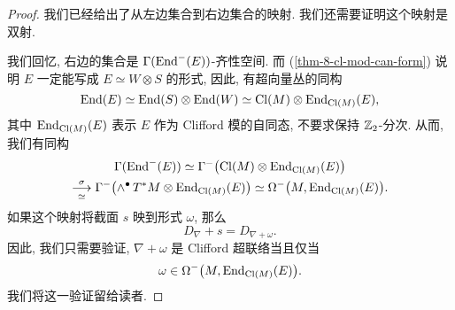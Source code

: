 \begin{proof}
    我们已经给出了从左边集合到右边集合的映射.
    我们还需要证明这个映射是双射.
    
    我们回忆, 右边的集合是 $\Gamma (\operatorname{End}^- (E))$-齐性空间.
    而 (\ref{thm-8-cl-mod-can-form}) 说明
    $E$ 一定能写成 $E \simeq W \otimes S$ 的形式,
    因此, 有超向量丛的同构
    \[ \operatorname{End} (E) \simeq \operatorname{End} (S) \otimes \operatorname{End} (W)
        \simeq \operatorname{Cl} (M) \otimes \operatorname{End}_{\operatorname{Cl} (M)} (E), \]
    其中 $\operatorname{End}_{\operatorname{Cl} (M)} (E)$ 表示 $E$ 作为 Clifford 模的自同态,
    不要求保持 $\mathbb{Z}_2$-分次. 从而, 我们有同构
    \begin{multline*}
        \Gamma (\operatorname{End}^- (E))
        \simeq \Gamma^- \bigl( \operatorname{Cl} (M) \otimes \operatorname{End}_{\operatorname{Cl} (M)} (E) \bigr) \\
        \overset{\sigma}{ \underset{\simeq}{\longrightarrow} }
            \Gamma^- \bigl( \wedge^\bullet \, T^* M \otimes \operatorname{End}_{\operatorname{Cl} (M)} (E) \bigr)
        \simeq \Omega^- \bigl( M, \operatorname{End}_{\operatorname{Cl} (M)} (E) \bigr).
    \end{multline*}
    如果这个映射将截面 $s$ 映到形式 $\omega$, 那么
    \[ D_{\nabla} + s = D_{\nabla + \omega}. \]
    因此, 我们只需要验证, $\nabla + \omega$ 是 Clifford 超联络当且仅当
    \[ \omega \in \Omega^- \bigl( M, \operatorname{End}_{\operatorname{Cl} (M)} (E) \bigr). \]
    我们将这一验证留给读者.
\end{proof}

